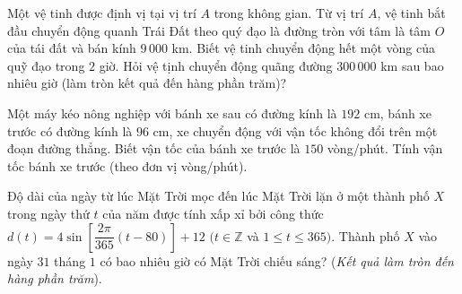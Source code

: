 \begin{ex}%
	Một vệ tinh được định vị tại vị trí $A$ trong không gian. Từ vị trí $A$, vệ tinh bắt đầu chuyển động quanh Trái Đất theo quý đạo là đường tròn với tâm là tâm $O$ của tái đất và bán kính $9\,000$ km. Biết vệ tinh chuyển động hết một vòng của quỹ đạo trong $2$ giờ. Hỏi vệ  tịnh chuyển động quãng đường $300\,000$ km sau bao nhiêu giờ (làm tròn kết quả đến hàng phần trăm)?
\end{ex}

\begin{ex}%
	Một máy kéo nông nghiệp với bánh  xe sau có đường kính là $192$ cm, bánh xe trước có đường kính là $96$ cm, xe chuyển động với vận tốc không đổi trên một đoạn đường thẳng. Biết vận tốc của bánh xe trước là $150$ vòng/phút. Tính vận tốc bánh xe trước (theo đơn vị vòng/phút).
\end{ex}

\begin{ex}%
	Độ dài của ngày từ lúc Mặt Trời mọc đến lúc Mặt Trời lặn ở một thành phố $X$ trong  ngày thứ $t$ của năm được tính xấp xỉ bởi công thức $d(t)=4\sin\left[\dfrac{2\pi }{365} (t-80)\right]+12\,\, (t\in \mathbb{Z}$ và $1\le t\le 365)$. Thành phố $X$ vào ngày $31$ tháng $1$ có bao nhiêu giờ có Mặt Trời chiếu sáng? (\textit{Kết quả làm tròn đến hàng phần trăm}).
\end{ex}

